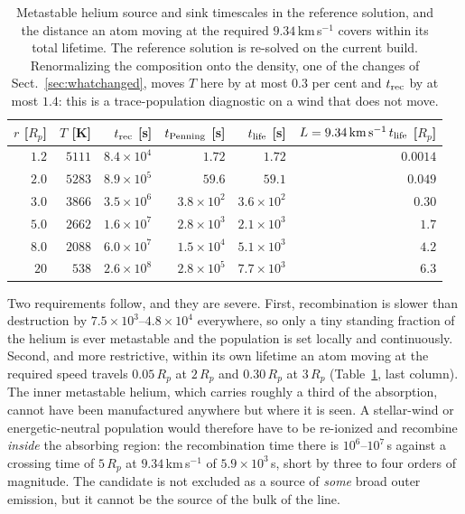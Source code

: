 \documentclass[english,a4paper]{my_memo}
\begin{document}
\begin{table}[htbp]\centering
\caption{Metastable helium source and sink timescales in the reference
solution, and the distance an atom moving at the required
$9.34$\,km\,s$^{-1}$ covers within its total lifetime. The reference solution
is re-solved on the current build. Renormalizing the composition onto the
density, one of the changes of Sect.~\ref{sec:whatchanged}, moves $T$ here by
at most $0.3$ per cent and $t_{\rm rec}$ by at most $1.4$: this is a
trace-population diagnostic on a wind that does not move.}
\label{tab:metatimes}
\begin{tabular}{rrrrrr}
\toprule
$r$ [$R_p$] & $T$ [K] & $t_{\rm rec}$ [s] & $t_{\rm Penning}$ [s] &
$t_{\rm life}$ [s] & $L = 9.34\,{\rm km\,s^{-1}}\,t_{\rm life}$ [$R_p$] \\
\midrule
$1.2$  & $5111$ & $8.4\times 10^{4}$ & $1.72$             & $1.72$             & $0.0014$ \\
$2.0$  & $5283$ & $8.9\times 10^{5}$ & $59.6$             & $59.1$             & $0.049$ \\
$3.0$  & $3866$ & $3.5\times 10^{6}$ & $3.8\times 10^{2}$ & $3.6\times 10^{2}$ & $0.30$ \\
$5.0$  & $2662$ & $1.6\times 10^{7}$ & $2.8\times 10^{3}$ & $2.1\times 10^{3}$ & $1.7$ \\
$8.0$  & $2088$ & $6.0\times 10^{7}$ & $1.5\times 10^{4}$ & $5.1\times 10^{3}$ & $4.2$ \\
$20$   & $538$  & $2.6\times 10^{8}$ & $2.8\times 10^{5}$ & $7.7\times 10^{3}$ & $6.3$ \\
\bottomrule
\end{tabular}
\end{table}

Two requirements follow, and they are severe. First, recombination is slower
than destruction by $7.5\times10^{3}$--$4.8\times10^{4}$ everywhere, so only
a tiny standing fraction of the helium is ever metastable and the population
is set locally and continuously. Second, and more restrictive, within its own
lifetime an atom moving at the required speed travels $0.05\,R_p$ at
$2\,R_p$ and $0.30\,R_p$ at $3\,R_p$ (Table~\ref{tab:metatimes}, last
column). The inner metastable helium, which carries roughly a third of the
absorption, cannot have been manufactured anywhere but where it is seen. A
stellar-wind or energetic-neutral population would therefore have to be
re-ionized and recombine \emph{inside} the absorbing region: the
recombination time there is $10^{6}$--$10^{7}$\,s against a crossing time of
$5\,R_p$ at $9.34$\,km\,s$^{-1}$ of $5.9\times 10^{3}$\,s, short by three to
four orders of magnitude. The candidate is not excluded as a source of
\emph{some} broad outer emission, but it cannot be the source of the bulk of
the line.
\end{document}
